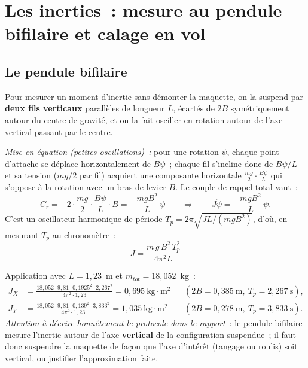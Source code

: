 \documentclass[a4paper,11pt]{article}
\begin{document}
\section{Les inerties~: mesure au pendule bifilaire et calage en vol}
\label{sec:inerties}

\subsection{Le pendule bifilaire}

Pour mesurer un moment d'inertie sans démonter la maquette, on la suspend par
\textbf{deux fils verticaux} parallèles de longueur $L$, écartés de $2B$
symétriquement autour du centre de gravité, et on la fait osciller en rotation
autour de l'axe vertical passant par le centre.

\emph{Mise en équation (petites oscillations)~:} pour une rotation $\psi$,
chaque point d'attache se déplace horizontalement de $B\psi$~; chaque fil
s'incline donc de $B\psi/L$ et sa tension ($m g/2$ par fil) acquiert une
composante horizontale $\tfrac{mg}{2}\cdot\tfrac{B\psi}{L}$ qui s'oppose à la
rotation avec un bras de levier $B$. Le couple de rappel total vaut~:
\begin{equation}
    C_r = -2 \cdot \frac{m g}{2}\cdot\frac{B\psi}{L}\cdot B
        = -\frac{m g B^2}{L}\,\psi
    \qquad\Longrightarrow\qquad
    J\ddot\psi = -\frac{m g B^2}{L}\,\psi .
\end{equation}
C'est un oscillateur harmonique de période $T_p = 2\pi\sqrt{J L /(m g B^2)}$,
d'où, en mesurant $T_p$ au chronomètre~:
\begin{equation}
    \boxed{\;J = \frac{m\,g\,B^2\,T_p^2}{4\pi^2 L}\;}
\end{equation}

Application avec $L = 1{,}23$~m et $m_{tot} = 18{,}052$~kg~:
\begin{align}
    J_X &= \frac{18{,}052 \cdot 9{,}81 \cdot 0{,}1925^2 \cdot 2{,}267^2}{4\pi^2 \cdot 1{,}23}
         = 0{,}695\ \text{kg}\cdot\text{m}^2
         &&(2B = 0{,}385\ \text{m},\ T_p = 2{,}267\ \text{s}),\\
    J_Y &= \frac{18{,}052 \cdot 9{,}81 \cdot 0{,}139^2 \cdot 3{,}833^2}{4\pi^2 \cdot 1{,}23}
         = 1{,}035\ \text{kg}\cdot\text{m}^2
         &&(2B = 0{,}278\ \text{m},\ T_p = 3{,}833\ \text{s}).
\end{align}
\emph{Attention à décrire honnêtement le protocole dans le rapport}~: le
pendule bifilaire mesure l'inertie autour de l'axe \textbf{vertical} de la
configuration suspendue~; il faut donc suspendre la maquette de façon que
l'axe d'intérêt (tangage ou roulis) soit vertical, ou justifier
l'approximation faite.
\end{document}
